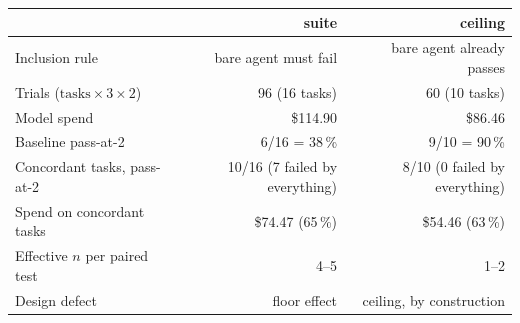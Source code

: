 
\begin{tabular}{@{}lrr@{}}
\toprule
 & \textbf{suite} & \textbf{ceiling} \\
\midrule
Inclusion rule & bare agent must fail & bare agent already passes \\
Trials ($\text{tasks}\times3\times2$) & 96 (16 tasks) & 60 (10 tasks) \\
Model spend & \$114.90 & \$86.46 \\
Baseline pass-at-2 & 6/16 = 38\,\% & 9/10 = 90\,\% \\
Concordant tasks, pass-at-2 & 10/16 (7 failed by everything) & 8/10 (0 failed by everything) \\
Spend on concordant tasks & \$74.47 (65\,\%) & \$54.46 (63\,\%) \\
Effective $n$ per paired test & 4--5 & 1--2 \\
Design defect & floor effect & ceiling, by construction \\
\bottomrule
\end{tabular}
